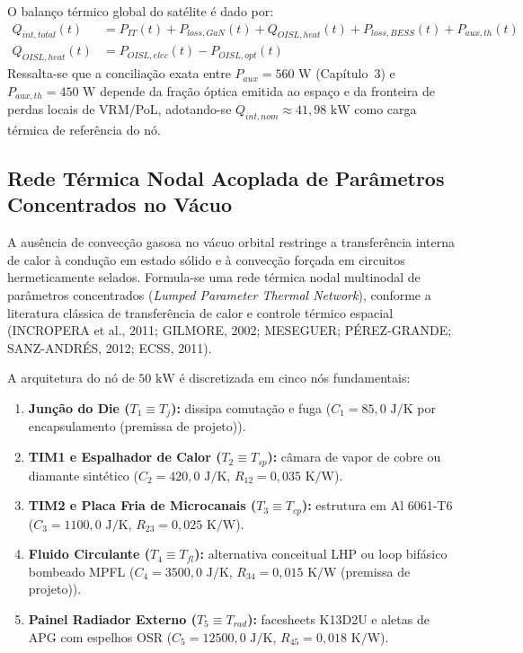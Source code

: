 O balanço térmico global do satélite é dado por:
\begin{align}
    Q_{int,total}(t) &= P_{IT}(t) + P_{loss,GaN}(t) + Q_{OISL,heat}(t) + P_{loss,BESS}(t) + P_{aux,th}(t) \label{eq:balanco_termico_global_no} \\
    Q_{OISL,heat}(t) &= P_{OISL,elec}(t) - P_{OISL,opt}(t)
\end{align}
Ressalta-se que a conciliação exata entre $P_{aux}=560\text{ W}$ (Capítulo~3) e $P_{aux,th}=450\text{ W}$ depende da fração óptica emitida ao espaço e da fronteira de perdas locais de VRM/PoL, adotando-se $Q_{int,nom} \approx 41{,}98\text{ kW}$ como carga térmica de referência do nó.

\subsection{Rede Térmica Nodal Acoplada de Parâmetros Concentrados no Vácuo}
\label{sec:rede_nodal_termica}

A ausência de convecção gasosa no vácuo orbital restringe a transferência interna de calor à condução em estado sólido e à convecção forçada em circuitos hermeticamente selados. Formula-se uma rede térmica nodal multinodal de parâmetros concentrados (\textit{Lumped Parameter Thermal Network}), conforme a literatura clássica de transferência de calor e controle térmico espacial (INCROPERA et al., 2011; GILMORE, 2002; MESEGUER; PÉREZ-GRANDE; SANZ-ANDRÉS, 2012; ECSS, 2011).

A arquitetura do nó de $50\text{ kW}$ é discretizada em cinco nós fundamentais:
\begin{enumerate}[label=\textbf{Nó \arabic*:},leftmargin=*]
    \item \textbf{Junção do Die ($T_1 \equiv T_j$):} dissipa comutação e fuga ($C_1=85{,}0\text{ J/K}$ por encapsulamento (premissa de projeto)).
    \item \textbf{TIM1 e Espalhador de Calor ($T_2 \equiv T_{sp}$):} câmara de vapor de cobre ou diamante sintético ($C_2 = 420{,}0\text{ J/K}$, $R_{12} = 0{,}035\text{ K/W}$).
    \item \textbf{TIM2 e Placa Fria de Microcanais ($T_3 \equiv T_{cp}$):} estrutura em Al 6061-T6 ($C_3 = 1100{,}0\text{ J/K}$, $R_{23} = 0{,}025\text{ K/W}$).
    \item \textbf{Fluido Circulante ($T_4 \equiv T_{fl}$):} alternativa conceitual LHP ou loop bifásico bombeado MPFL ($C_4 = 3500{,}0\text{ J/K}$, $R_{34} = 0{,}015\text{ K/W}$ (premissa de projeto)).
    \item \textbf{Painel Radiador Externo ($T_5 \equiv T_{rad}$):} facesheets K13D2U e aletas de APG com espelhos OSR ($C_5 = 12500{,}0\text{ J/K}$, $R_{45} = 0{,}018\text{ K/W}$).
\end{enumerate}

